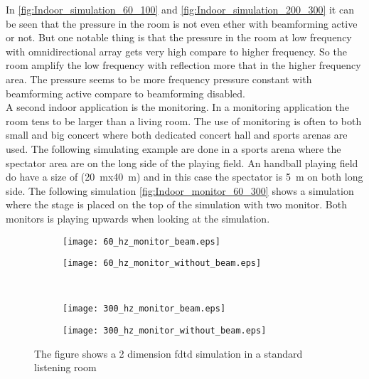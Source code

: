 In \autoref{fig:Indoor_simulation_60_100} and \autoref{fig:Indoor_simulation_200_300} it can be seen that the pressure in the room is not even ether with beamforming active or not. But one notable thing is that the pressure in the room at low frequency with omnidirectional array gets very high compare to higher frequency. So the room amplify the low frequency with reflection more that in the higher frequency area. The pressure seems to be more frequency pressure constant with beamforming active compare to beamforming disabled.\\


A second indoor application is the monitoring. In a monitoring application the room tens to be larger than a living room. The use of monitoring is often to both small and big concert where both dedicated concert hall and sports arenas are used. The following simulating example are done in a sports arena where the spectator area are on the long side of the playing field. An handball playing field do have a size of (\SI{20}{\meter}x\SI{40}{\meter}) and in this case the spectator is \SI{5}{\meter} on both long side. The following simulation \autoref{fig:Indoor_monitor_60_300} shows a simulation where the stage is placed on the top of the simulation with two monitor. Both monitors is playing upwards when looking at the simulation.


\begin{figure}[H]
\begin{subfigure}[c]{0.5\textwidth}
\texttt{[image: 60\_hz\_monitor\_beam.eps]}
\label{fig:Indoor_monitor_60_on}
\end{subfigure}
\begin{subfigure}[c]{0.5\textwidth}
\texttt{[image: 60\_hz\_monitor\_without\_beam.eps]}
\label{fig:Indoor_monitor_60_off}
\end{subfigure}\\
\hspace{0.1\textheight}
\begin{subfigure}[c]{0.5\textwidth}
\texttt{[image: 300\_hz\_monitor\_beam.eps]}
\label{fig:Indoor_monitor_300_on}
\end{subfigure}
\begin{subfigure}[c]{0.5\textwidth}
\texttt{[image: 300\_hz\_monitor\_without\_beam.eps]}
\label{fig:Indoor_monitor_300_off}
\end{subfigure}
\caption{The figure shows a 2 dimension \gls{fdtd} simulation in a standard listening room}
		\label{fig:Indoor_monitor_60_300}
\end{figure}

